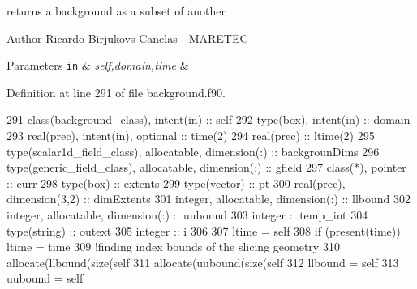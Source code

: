 returns a background as a subset of another 

\begin{DoxyAuthor}{Author}
Ricardo Birjukovs Canelas -\/ M\+A\+R\+E\+T\+EC 
\end{DoxyAuthor}

\begin{DoxyParams}[1]{Parameters}
\mbox{\tt in}  & {\em self,domain,time} & \\
\hline
\end{DoxyParams}


Definition at line 291 of file background.\+f90.


\begin{DoxyCode}
291     \textcolor{keywordtype}{class}(background\_class), \textcolor{keywordtype}{intent(in)} :: self
292     \textcolor{keywordtype}{type}(box), \textcolor{keywordtype}{intent(in)} :: domain
293     \textcolor{keywordtype}{real(prec)}, \textcolor{keywordtype}{intent(in)}, \textcolor{keywordtype}{optional} :: time(2)
294     \textcolor{keywordtype}{real(prec)} :: ltime(2)
295     \textcolor{keywordtype}{type}(scalar1d\_field\_class), \textcolor{keywordtype}{allocatable}, \textcolor{keywordtype}{dimension(:)} :: backgrounDims
296     \textcolor{keywordtype}{type}(generic\_field\_class), \textcolor{keywordtype}{allocatable}, \textcolor{keywordtype}{dimension(:)} :: gfield
297     \textcolor{keywordtype}{class}(*), \textcolor{keywordtype}{pointer} :: curr
298     \textcolor{keywordtype}{type}(box) :: extents
299     \textcolor{keywordtype}{type}(vector) :: pt
300     \textcolor{keywordtype}{real(prec)}, \textcolor{keywordtype}{dimension(3,2)} :: dimExtents
301     \textcolor{keywordtype}{integer}, \textcolor{keywordtype}{allocatable}, \textcolor{keywordtype}{dimension(:)} :: llbound
302     \textcolor{keywordtype}{integer}, \textcolor{keywordtype}{allocatable}, \textcolor{keywordtype}{dimension(:)} :: uubound
303     \textcolor{keywordtype}{integer} :: temp\_int
304     \textcolor{keywordtype}{type}(string) :: outext
305     \textcolor{keywordtype}{integer} :: i
306 
307     ltime = self%
308     \textcolor{keywordflow}{if} (\textcolor{keyword}{present}(time)) ltime = time
309     \textcolor{comment}{!finding index bounds of the slicing geometry}
310     \textcolor{keyword}{allocate}(llbound(\textcolor{keyword}{size}(self%
311     \textcolor{keyword}{allocate}(uubound(\textcolor{keyword}{size}(self%
312     llbound = self%
313     uubound = self%

\end{DoxyCode}
